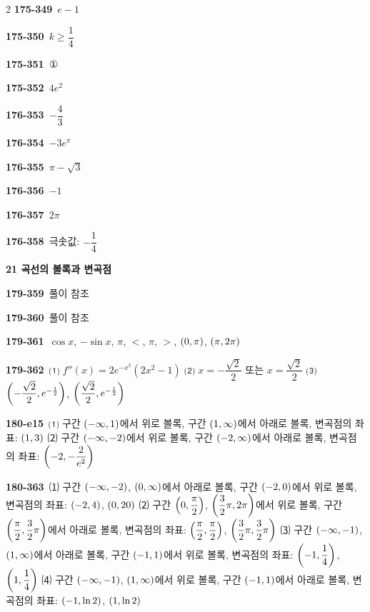 \documentclass[10pt,a4paper]{article}
\begin{document}
\begin{multicols}{2}
\noindent\textbf{175-349}\ $e-1$\par
\noindent\textbf{175-350}\ $k\ge\dfrac{1}{4}$\par
\noindent\textbf{175-351}\ ①\par
\noindent\textbf{175-352}\ $4e^2$\par
\noindent\textbf{176-353}\ $-\dfrac{4}{3}$\par
\noindent\textbf{176-354}\ $-3e^{\pi}$\par
\noindent\textbf{176-355}\ $\pi-\sqrt{3}$\par
\noindent\textbf{176-356}\ $-1$\par
\noindent\textbf{176-357}\ $2\pi$\par
\noindent\textbf{176-358}\ 극솟값: $-\dfrac{1}{4}$\par
\noindent\textbf{21 곡선의 볼록과 변곡점}\par\smallskip
\noindent\textbf{179-359}\ 풀이 참조\par
\noindent\textbf{179-360}\ 풀이 참조\par
\noindent\textbf{179-361}\ $\cos x$, $-\sin x$, $\pi$, $<$, $\pi$, $>$, $(0{,}\mkern3mu\mathopen{}\pi)$, $(\pi{,}\mkern3mu\mathopen{}2\pi)$\par
\noindent\textbf{179-362}\ ⑴ $f''(x)=2e^{-x^2}(2x^2-1)$ ⑵ $x=-\dfrac{\sqrt{2}}{2}$ 또는 $x=\dfrac{\sqrt{2}}{2}$ ⑶ $\left(-\dfrac{\sqrt{2}}{2}{,}\mkern3mu\mathopen{}e^{-\frac{1}{2}}\right)$, $\left(\dfrac{\sqrt{2}}{2}{,}\mkern3mu\mathopen{}e^{-\frac{1}{2}}\right)$\par
\noindent\textbf{180-e15}\ ⑴ 구간 $(-\infty{,}\mkern3mu\mathopen{}1)$에서 위로 볼록, 구간 $(1{,}\mkern3mu\mathopen{}\infty)$에서 아래로 볼록, 변곡점의 좌표: $(1{,}\mkern3mu\mathopen{}3)$ ⑵ 구간 $(-\infty{,}\mkern3mu\mathopen{}-2)$에서 위로 볼록, 구간 $(-2{,}\mkern3mu\mathopen{}\infty)$에서 아래로 볼록, 변곡점의 좌표: $\left(-2{,}\mkern3mu\mathopen{}-\dfrac{2}{e^2}\right)$\par
\noindent\textbf{180-363}\ ⑴ 구간 $(-\infty{,}\mkern3mu\mathopen{}-2)$, $(0{,}\mkern3mu\mathopen{}\infty)$에서 아래로 볼록, 구간 $(-2{,}\mkern3mu\mathopen{}0)$에서 위로 볼록, 변곡점의 좌표: $(-2{,}\mkern3mu\mathopen{}4)$, $(0{,}\mkern3mu\mathopen{}20)$ ⑵ 구간 $\left(0{,}\mkern3mu\mathopen{}\dfrac{\pi}{2}\right)$, $\left(\dfrac{3}{2}\pi{,}\mkern3mu\mathopen{}2\pi\right)$에서 위로 볼록, 구간 $\left(\dfrac{\pi}{2}{,}\mkern3mu\mathopen{}\dfrac{3}{2}\pi\right)$에서 아래로 볼록, 변곡점의 좌표: $\left(\dfrac{\pi}{2}{,}\mkern3mu\mathopen{}\dfrac{\pi}{2}\right)$, $\left(\dfrac{3}{2}\pi{,}\mkern3mu\mathopen{}\dfrac{3}{2}\pi\right)$ ⑶ 구간 $(-\infty{,}\mkern3mu\mathopen{}-1)$, $(1{,}\mkern3mu\mathopen{}\infty)$에서 아래로 볼록, 구간 $(-1{,}\mkern3mu\mathopen{}1)$에서 위로 볼록, 변곡점의 좌표: $\left(-1{,}\mkern3mu\mathopen{}\dfrac{1}{4}\right)$, $\left(1{,}\mkern3mu\mathopen{}\dfrac{1}{4}\right)$ ⑷ 구간 $(-\infty{,}\mkern3mu\mathopen{}-1)$, $(1{,}\mkern3mu\mathopen{}\infty)$에서 위로 볼록, 구간 $(-1{,}\mkern3mu\mathopen{}1)$에서 아래로 볼록, 변곡점의 좌표: $(-1{,}\mkern3mu\mathopen{}\ln 2)$, $(1{,}\mkern3mu\mathopen{}\ln 2)$\par

\end{multicols}
\end{document}
